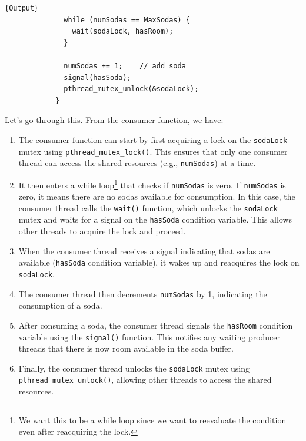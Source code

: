 \documentclass{article}
\newcounter{example}[section]
\begin{document}
\begin{example}
\begin{enumerate}
\begin{minipage}{.49\linewidth}
\begin{lstlisting}[]{Output}
              while (numSodas == MaxSodas) {
                wait(sodaLock, hasRoom); 
              }

              numSodas += 1;    // add soda 
              signal(hasSoda);  
              pthread_mutex_unlock(&sodaLock); 
            }
          \end{lstlisting}
          \end{minipage}
      \end{enumerate}
      Let's go through this. From the consumer function, we have: 
      
      \begin{enumerate}
        \item The consumer function can start by first acquiring a lock on the \texttt{sodaLock} mutex using \texttt{pthread\_mutex\_lock()}. This ensures that only one consumer thread can access the shared resources (e.g., \texttt{numSodas}) at a time.

        \item It then enters a while loop\footnote{We want this to be a while loop since we want to reevaluate the condition even after reacquiring the lock. } that checks if \texttt{numSodas} is zero. If \texttt{numSodas} is zero, it means there are no sodas available for consumption. In this case, the consumer thread calls the \texttt{wait()} function, which unlocks the \texttt{sodaLock} mutex and waits for a signal on the \texttt{hasSoda} condition variable. This allows other threads to acquire the lock and proceed.

        \item When the consumer thread receives a signal indicating that sodas are available (\texttt{hasSoda} condition variable), it wakes up and reacquires the lock on \texttt{sodaLock}.

        \item The consumer thread then decrements \texttt{numSodas} by 1, indicating the consumption of a soda.

        \item After consuming a soda, the consumer thread signals the \texttt{hasRoom} condition variable using the \texttt{signal()} function. This notifies any waiting producer threads that there is now room available in the soda buffer.

        \item Finally, the consumer thread unlocks the \texttt{sodaLock} mutex using \texttt{pthread\_mutex\_unlock()}, allowing other threads to access the shared resources.
      \end{enumerate}
      

\end{example}
\end{document}
